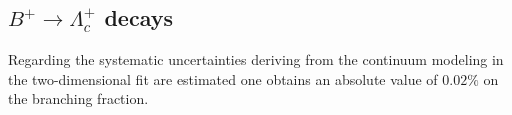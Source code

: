     \subsection{$B^+ \rightarrow \Lambda_c^+$ decays}

    Regarding the systematic uncertainties deriving from the continuum modeling in the two-dimensional fit are estimated 
    one obtains an absolute value of $0.02\%$ on the branching fraction.\\